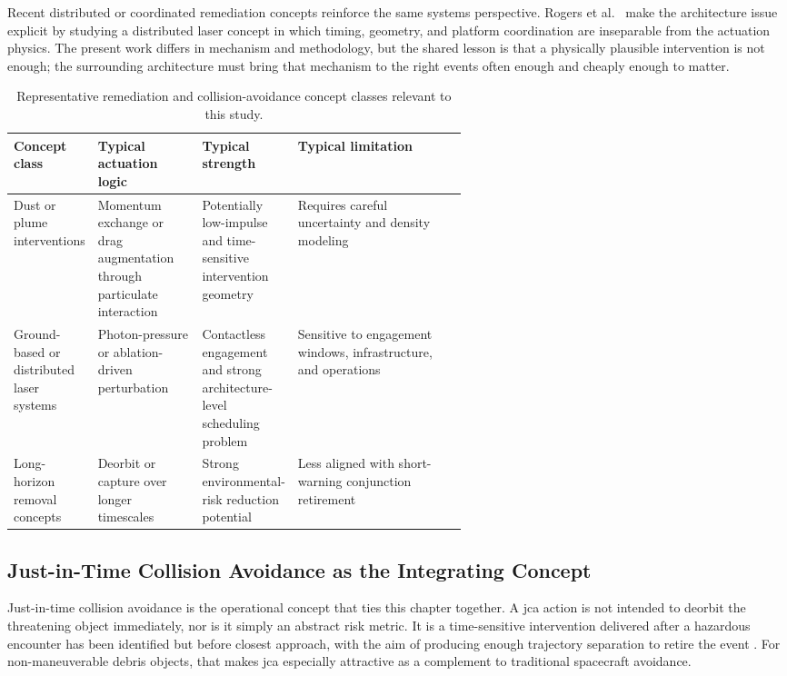 Recent distributed or coordinated remediation concepts reinforce the same systems perspective. Rogers et al.\ \cite{Rogers2025DistributedLaser} make the architecture issue explicit by studying a distributed laser concept in which timing, geometry, and platform coordination are inseparable from the actuation physics. The present work differs in mechanism and methodology, but the shared lesson is that a physically plausible intervention is not enough; the surrounding architecture must bring that mechanism to the right events often enough and cheaply enough to matter.

\begin{table}[htb]
    \centering
    \caption[Representative remediation concepts]{Representative remediation and collision-avoidance concept classes relevant to this study.}
    \label{tab:remediation_concepts}
    \begin{tabularx}{0.94\linewidth}{@{}L{0.17\linewidth}L{0.23\linewidth}L{0.18\linewidth}Y@{}}
        \toprule
        Concept class & Typical actuation logic & Typical strength & Typical limitation \\
        \midrule
        Dust or plume interventions & Momentum exchange or drag augmentation through particulate interaction & Potentially low-impulse and time-sensitive intervention geometry & Requires careful uncertainty and density modeling \\
        Ground-based or distributed laser systems & Photon-pressure or ablation-driven perturbation & Contactless engagement and strong architecture-level scheduling problem & Sensitive to engagement windows, infrastructure, and operations \\
        Long-horizon removal concepts & Deorbit or capture over longer timescales & Strong environmental-risk reduction potential & Less aligned with short-warning conjunction retirement \\
        \bottomrule
    \end{tabularx}
\end{table}

\subsection{Just-in-Time Collision Avoidance as the Integrating Concept}
Just-in-time collision avoidance is the operational concept that ties this chapter together. A \gls{jca} action is not intended to deorbit the threatening object immediately, nor is it simply an abstract risk metric. It is a time-sensitive intervention delivered after a hazardous encounter has been identified but before closest approach, with the aim of producing enough trajectory separation to retire the event \cite{JARRY2019185,GonzaloColombo2020}. For non-maneuverable debris objects, that makes \gls{jca} especially attractive as a complement to traditional spacecraft avoidance.

